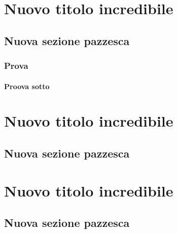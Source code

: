 \documentclass[a4paper, 11pt, openright, twoside]{report}
\begin{document}
\lipsum[1-2]


\chapter[Nuovo titolo incredibile]{Nuovo titolo incredibile}
\label{chap:Nuovo titolo incredibile}

\lipsum[1]

\section[Nuova sezione pazzesca]{Nuova sezione pazzesca}
\label{chap:Nuova sezione pazzesca}

\subsection[Prova]{Prova}
\label{chap:Prova}

\subsubsection[Proova sotto]{Proova sotto}
\label{chap:Proova sotto}

\chapter[Nuovo titolo incredibile]{Nuovo titolo incredibile}
\label{chap:Nuovo titolo incredibile}

\lipsum[1]

\section[Nuova sezione pazzesca]{Nuova sezione pazzesca}
\label{chap:Nuova sezione pazzesca}

\lipsum[1-2]


\chapter[Nuovo titolo incredibile]{Nuovo titolo incredibile}
\label{chap:Nuovo titolo incredibile}

\lipsum[1]

\section[Nuova sezione pazzesca]{Nuova sezione pazzesca}
\label{chap:Nuova sezione pazzesca}
\end{document}
